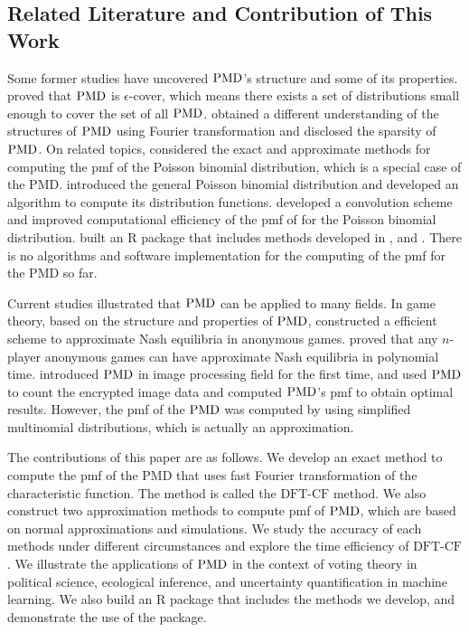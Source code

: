 \documentclass[12pt]{article}
\newcommand{\PMD}{{\normalfont\textrm{PMD}}}
\newcommand{\dft}{{\textrm{DFT-CF}}}
\begin{document}
\subsection{Related Literature and Contribution of This Work}

Some former studies have uncovered $\PMD$'s structure and some of its properties.  proved that $\PMD$ is $\epsilon$-cover, which means there exists a set of distributions small enough to cover the set of all $\PMD$.   obtained a different understanding of the structures of $\PMD$ using Fourier transformation and disclosed the sparsity of $\PMD$. On related topics,  considered the exact and approximate methods for computing the pmf of the Poisson binomial distribution, which is a special case of the PMD.  introduced the general Poisson binomial distribution and developed an algorithm to compute its distribution functions.  developed a convolution scheme and improved computational efficiency of the pmf of for the Poisson binomial distribution.  built an R package that includes methods developed in ,  and . There is no algorithms and software implementation for the computing of the pmf for the PMD so far.

Current studies illustrated that $\PMD$ can be applied to many fields. In game theory, based on the structure and properties of $\PMD$,  constructed a efficient scheme to approximate Nash equilibria in anonymous games.  proved that any $n$-player anonymous games can have approximate Nash equilibria in polynomial time.  introduced $\PMD$ in image processing field for the first time, and used $\PMD$ to count the encrypted image data and computed $\PMD$'s pmf to obtain optimal results. However, the pmf of the $\PMD$ was computed by using simplified multinomial distributions, which is actually an approximation.

The contributions of this paper are as follows. We develop an exact method to compute the pmf of the PMD that uses fast Fourier transformation of the characteristic function.  The method is called the $\dft$ method. We also construct two approximation methods to compute pmf of $\PMD$, which are based on normal approximations and simulations. We study the accuracy of each methods under different circumstances and explore the time efficiency of $\dft$. We illustrate the applications of $\PMD$ in the context of voting theory in political science, ecological inference, and uncertainty quantification in machine learning. We also build an R package that includes the methods we develop, and demonstrate the use of the package.
\end{document}
